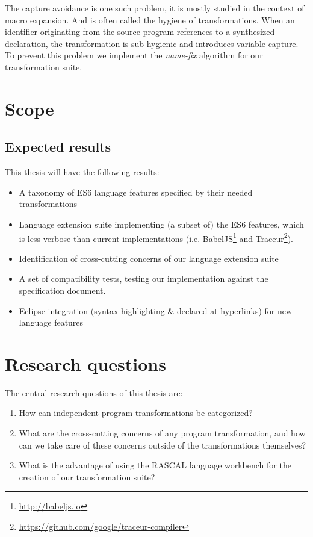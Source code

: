 The capture avoidance is one such problem, it is mostly studied in the context of macro expansion\cite{Herman2010a,Herman2010,Disney2014}. And is often called the hygiene of transformations. When an identifier originating from the source program references to a synthesized declaration, the transformation is sub-hygienic and introduces variable capture. To prevent this problem we implement the \textit{name-fix} algorithm\cite{Erdweg2014} for our transformation suite.

\section{Scope}

\subsection{Expected results}
This thesis will have the following results:
\begin{itemize}
	\item A taxonomy of ES6 language features specified by their needed transformations
	\item Language extension suite implementing (a subset of) the ES6 features, which is less verbose than current implementations (i.e. BabelJS\footnote{\url{http://babeljs.io}} and Traceur\footnote{\url{https://github.com/google/traceur-compiler}}).
	\item Identification of cross-cutting concerns of our language extension suite
	\item A set of compatibility tests, testing our implementation against the specification document.
	\item Eclipse integration (syntax highlighting \& declared at hyperlinks) for new language features
\end{itemize}
\section{Research questions}
The central research questions of this thesis are:

\begin{enumerate}
	\item How can independent program transformations be categorized?
	\item What are the cross-cutting concerns of any program transformation, and how can we take care of these concerns outside of the transformations themselves?
	\item What is the advantage of using the RASCAL language workbench\cite{Klint} for the creation of our transformation suite?
\end{enumerate}


